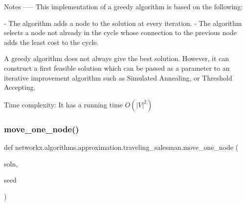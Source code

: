 \begin{DoxyVerb}
Notes
-----
This implementation of a greedy algorithm is based on the following:

- The algorithm adds a node to the solution at every iteration.
- The algorithm selects a node not already in the cycle whose connection
  to the previous node adds the least cost to the cycle.

A greedy algorithm does not always give the best solution.
However, it can construct a first feasible solution which can
be passed as a parameter to an iterative improvement algorithm such
as Simulated Annealing, or Threshold Accepting.

Time complexity: It has a running time $O(|V|^2)$
\end{DoxyVerb}
 \mbox{\label{namespacenetworkx_1_1algorithms_1_1approximation_1_1traveling__salesman_af9505dd8c1940e16144026f1c44fbdb0}} 
\subsubsection{\texorpdfstring{move\+\_\+one\+\_\+node()}{move\_one\_node()}}
{\footnotesize\ttfamily def networkx.\+algorithms.\+approximation.\+traveling\+\_\+salesman.\+move\+\_\+one\+\_\+node (\begin{DoxyParamCaption}\item[{}]{soln,  }\item[{}]{seed }\end{DoxyParamCaption})}


